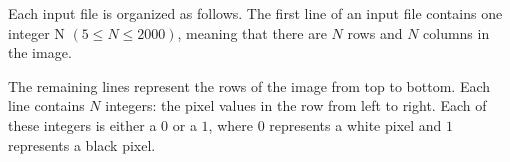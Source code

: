 Each input file is organized as follows. The first line of an input file contains one
integer N $(5 \le N \le 2000)$, meaning that there are $N$ rows and $N$ columns in the image. 

The remaining lines represent the rows of the image from top to bottom. Each line contains $N$ integers: the pixel values in the row from left to right. Each of these integers is either a $0$ or a $1$, where $0$ represents a white pixel and $1$ represents a black pixel.